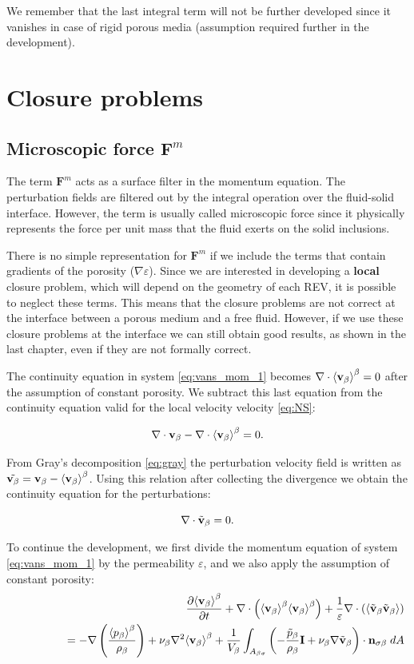 We remember that the last integral term will not be further developed since it vanishes in case of rigid porous media (assumption required further in the development).



\section{Closure problems}

\subsection{Microscopic force $\mathbf{F}^m$}
\label{ch:closure_fm}
The term $\mathbf{F}^m$ acts as a surface filter in the momentum equation. The perturbation fields are filtered out by the integral operation over the fluid-solid interface. However, the term is usually called microscopic force since it physically represents the force per unit mass that the fluid exerts on the solid inclusions.

There is no simple representation for $\mathbf{F}^m$ if we include the terms that contain gradients of the porosity ($\nabla \varepsilon$).
Since we are interested in developing a \textbf{local} closure problem, which will depend on the geometry of each REV, it is possible to neglect these terms.
This means that the closure problems are not correct at the interface between a porous medium and a free fluid. 
However, if we use these closure problems at the interface we can still obtain good results, as shown in the last chapter, even if they are not formally correct.

The continuity equation in system \eqref{eq:vans_mom_1} becomes $ \nabla \cdot  {\left< \textbf{v}_{\beta}\right>}^{\beta}=0$ after the assumption of constant porosity.
We subtract this last equation from the continuity equation valid for the local velocity velocity \eqref{eq:NS}:

$$
\nabla \cdot  \textbf{v}_{\beta} - \nabla \cdot  {\left< \textbf{v}_{\beta}\right>}^{\beta} = 0.
$$

From Gray's decomposition \eqref{eq:gray} the perturbation velocity field is written as $\tilde{\textbf{v}_{\beta}} = \textbf{v}_{\beta} - {\left< \textbf{v}_{\beta} \right>}^{\beta}$. Using this relation after collecting the divergence we obtain the continuity equation for the perturbations:

\begin{equation}
\nabla \cdot \tilde{\textbf{v}}_{\beta} = 0.
\end{equation}

\newpage 
\noindent To continue the development, we first divide the momentum equation of system \eqref{eq:vans_mom_1} by the permeability $\varepsilon$, and we also apply the assumption of constant porosity:
\begin{eqnarray}
&& \dfrac{\partial {\left< \textbf{v}_{\beta}\right>}^{\beta}}{\partial t} + \nabla \cdot \left({\left< \textbf{v}_{\beta} \right>}^{\beta}{\left< \textbf{v}_{\beta} \right>}^{\beta}\right)   + \dfrac{1}{\varepsilon}\nabla \cdot \left({\left< \tilde{\textbf{v}}_{\beta} \tilde{\textbf{v}}_{\beta} \right>}\right)   \nonumber \\
&& \qquad \qquad = - \nabla \left(\dfrac{{\left< p_{\beta} \right>}^{\beta}}{\rho_{\beta}}\right) + \nu_{\beta}  \nabla^2 {\left< \textbf{v}_{\beta} \right>}^{\beta} + \dfrac{1}{V_\beta} \displaystyle\int_{A_{\beta \sigma}} \left(-\dfrac{\tilde{p}_{\beta}}{\rho_{\beta}} \mathbf{I}  + \nu_{\beta} \nabla \tilde{\textbf{v}}_{\beta} \right)\cdot \mathbf{n}_{\sigma \beta} \;dA  \nonumber
\end{eqnarray}


